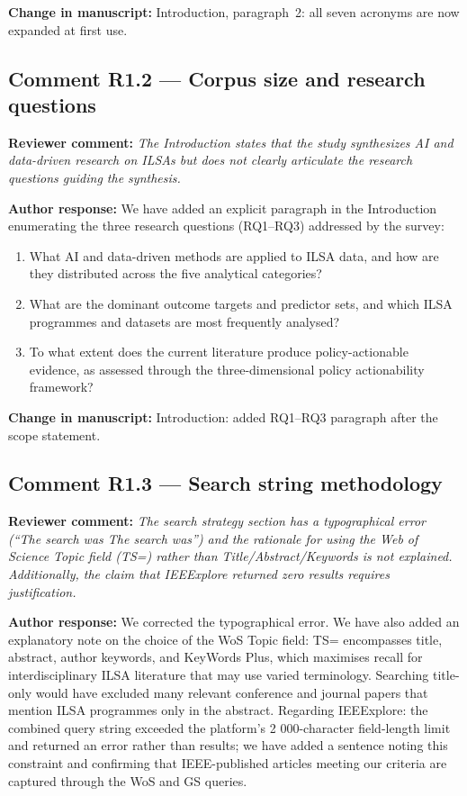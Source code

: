\documentclass[12pt,a4paper]{article}
\newcommand{\reviewer}[1]{\textcolor{reviewercolor}{\textbf{Reviewer comment:} \textit{#1}}}
\newcommand{\response}[1]{\textcolor{authorcolor}{\textbf{Author response:} #1}}
\newcommand{\change}[1]{\textbf{Change in manuscript:} #1}
\begin{document}
\change{Introduction, paragraph~2: all seven acronyms are now expanded at first use.}

\bigskip

\subsection*{Comment R1.2 — Corpus size and research questions}

\reviewer{The Introduction states that the study synthesizes AI and data-driven research on ILSAs but does not clearly articulate the research questions guiding the synthesis.}

\response{We have added an explicit paragraph in the Introduction enumerating the three research questions (RQ1--RQ3) addressed by the survey:
\begin{enumerate}[noitemsep]
  \item[\textbf{RQ1}] What AI and data-driven methods are applied to ILSA data, and how are they distributed across the five analytical categories?
  \item[\textbf{RQ2}] What are the dominant outcome targets and predictor sets, and which ILSA programmes and datasets are most frequently analysed?
  \item[\textbf{RQ3}] To what extent does the current literature produce policy-actionable evidence, as assessed through the three-dimensional policy actionability framework?
\end{enumerate}
}

\change{Introduction: added RQ1--RQ3 paragraph after the scope statement.}

\bigskip

\subsection*{Comment R1.3 — Search string methodology}

\reviewer{The search strategy section has a typographical error (``The search was The search was'') and the rationale for using the Web of Science Topic field (TS=) rather than Title/Abstract/Keywords is not explained. Additionally, the claim that IEEExplore returned zero results requires justification.}

\response{We corrected the typographical error. We have also added an explanatory note on the choice of the WoS Topic field: TS= encompasses title, abstract, author keywords, and KeyWords Plus, which maximises recall for interdisciplinary ILSA literature that may use varied terminology. Searching title-only would have excluded many relevant conference and journal papers that mention ILSA programmes only in the abstract. Regarding IEEExplore: the combined query string exceeded the platform's 2 000-character field-length limit and returned an error rather than results; we have added a sentence noting this constraint and confirming that IEEE-published articles meeting our criteria are captured through the WoS and GS queries.}
\end{document}
